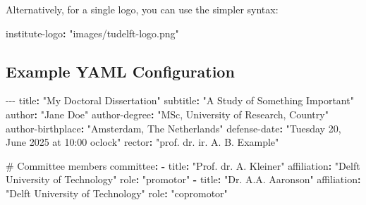 \documentclass{tudelft}
\newenvironment{Shaded}{\begin{snugshade}}{\end{snugshade}}
\newcommand{\AttributeTok}[1]{\textcolor[rgb]{0.40,0.45,0.13}{#1}}
\newcommand{\CommentTok}[1]{\textcolor[rgb]{0.37,0.37,0.37}{#1}}
\newcommand{\FunctionTok}[1]{\textcolor[rgb]{0.28,0.35,0.67}{#1}}
\newcommand{\KeywordTok}[1]{\textcolor[rgb]{0.00,0.23,0.31}{\textbf{#1}}}
\newcommand{\PreprocessorTok}[1]{\textcolor[rgb]{0.68,0.00,0.00}{#1}}
\newcommand{\StringTok}[1]{\textcolor[rgb]{0.13,0.47,0.30}{#1}}
\begin{document}
Alternatively, for a single logo, you can use the simpler syntax:

\begin{Shaded}
\begin{Highlighting}[]
\FunctionTok{institute{-}logo}\KeywordTok{:}\AttributeTok{ }\StringTok{"images/tudelft{-}logo.png"}
\end{Highlighting}
\end{Shaded}

\subsection{Example YAML
Configuration}\label{example-yaml-configuration}

\begin{Shaded}
\begin{Highlighting}[]
\PreprocessorTok{{-}{-}{-}}
\FunctionTok{title}\KeywordTok{:}\AttributeTok{ }\StringTok{"My Doctoral Dissertation"}
\FunctionTok{subtitle}\KeywordTok{:}\AttributeTok{ }\StringTok{"A Study of Something Important"}
\FunctionTok{author}\KeywordTok{:}\AttributeTok{ }\StringTok{"Jane Doe"}
\FunctionTok{author{-}degree}\KeywordTok{:}\AttributeTok{ }\StringTok{"MSc, University of Research, Country"}
\FunctionTok{author{-}birthplace}\KeywordTok{:}\AttributeTok{ }\StringTok{"Amsterdam, The Netherlands"}
\FunctionTok{defense{-}date}\KeywordTok{:}\AttributeTok{ }\StringTok{"Tuesday 20, June 2025 at 10:00 o\textquotesingle{}clock"}
\FunctionTok{rector}\KeywordTok{:}\AttributeTok{ }\StringTok{"prof. dr. ir. A. B. Example"}

\CommentTok{\# Committee members}
\FunctionTok{committee}\KeywordTok{:}
\AttributeTok{  }\KeywordTok{{-}}\AttributeTok{ }\FunctionTok{title}\KeywordTok{:}\AttributeTok{ }\StringTok{"Prof. dr. A. Kleiner"}
\AttributeTok{    }\FunctionTok{affiliation}\KeywordTok{:}\AttributeTok{ }\StringTok{"Delft University of Technology"}
\AttributeTok{    }\FunctionTok{role}\KeywordTok{:}\AttributeTok{ }\StringTok{"promotor"}
\AttributeTok{  }\KeywordTok{{-}}\AttributeTok{ }\FunctionTok{title}\KeywordTok{:}\AttributeTok{ }\StringTok{"Dr. A.A. Aaronson"}
\AttributeTok{    }\FunctionTok{affiliation}\KeywordTok{:}\AttributeTok{ }\StringTok{"Delft University of Technology"}
\AttributeTok{    }\FunctionTok{role}\KeywordTok{:}\AttributeTok{ }\StringTok{"copromotor"}


\end{Highlighting}
\end{Shaded}
\end{document}
